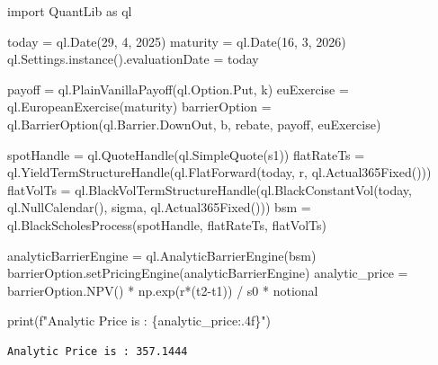 \documentclass[
  a4paper,
  DIV=11,
  numbers=noendperiod]{scrreprt}
\newenvironment{Shaded}{\begin{snugshade}}{\end{snugshade}}
\newcommand{\BuiltInTok}[1]{\textcolor[rgb]{0.00,0.23,0.31}{#1}}
\newcommand{\DecValTok}[1]{\textcolor[rgb]{0.68,0.00,0.00}{#1}}
\newcommand{\ImportTok}[1]{\textcolor[rgb]{0.00,0.46,0.62}{#1}}
\newcommand{\NormalTok}[1]{\textcolor[rgb]{0.00,0.23,0.31}{#1}}
\newcommand{\OperatorTok}[1]{\textcolor[rgb]{0.37,0.37,0.37}{#1}}
\newcommand{\SpecialCharTok}[1]{\textcolor[rgb]{0.37,0.37,0.37}{#1}}
\newcommand{\SpecialStringTok}[1]{\textcolor[rgb]{0.13,0.47,0.30}{#1}}
\begin{document}
\begin{tcolorbox}[enhanced jigsaw, bottomtitle=1mm, breakable, coltitle=black, opacityback=0, titlerule=0mm, left=2mm, colbacktitle=quarto-callout-tip-color!10!white, toptitle=1mm, colframe=quarto-callout-tip-color-frame, bottomrule=.15mm, opacitybacktitle=0.6, leftrule=.75mm, title=\textcolor{quarto-callout-tip-color}{\faLightbulb}\hspace{0.5em}{QuantLib을 이용한 배리어옵션 평가}, arc=.35mm, toprule=.15mm, rightrule=.15mm, colback=white]

\begin{Shaded}
\begin{Highlighting}[]
\ImportTok{import}\NormalTok{ QuantLib }\ImportTok{as}\NormalTok{ ql}

\NormalTok{today }\OperatorTok{=}\NormalTok{ ql.Date(}\DecValTok{29}\NormalTok{, }\DecValTok{4}\NormalTok{, }\DecValTok{2025}\NormalTok{)}
\NormalTok{maturity }\OperatorTok{=}\NormalTok{ ql.Date(}\DecValTok{16}\NormalTok{, }\DecValTok{3}\NormalTok{, }\DecValTok{2026}\NormalTok{)}
\NormalTok{ql.Settings.instance().evaluationDate }\OperatorTok{=}\NormalTok{ today}

\NormalTok{payoff }\OperatorTok{=}\NormalTok{ ql.PlainVanillaPayoff(ql.Option.Put, k)}
\NormalTok{euExercise }\OperatorTok{=}\NormalTok{ ql.EuropeanExercise(maturity)}
\NormalTok{barrierOption }\OperatorTok{=}\NormalTok{ ql.BarrierOption(ql.Barrier.DownOut, b, rebate, payoff, euExercise)}

\NormalTok{spotHandle }\OperatorTok{=}\NormalTok{ ql.QuoteHandle(ql.SimpleQuote(s1))}
\NormalTok{flatRateTs }\OperatorTok{=}\NormalTok{ ql.YieldTermStructureHandle(ql.FlatForward(today, r, ql.Actual365Fixed()))}
\NormalTok{flatVolTs }\OperatorTok{=}\NormalTok{ ql.BlackVolTermStructureHandle(ql.BlackConstantVol(today, ql.NullCalendar(), sigma, ql.Actual365Fixed()))}
\NormalTok{bsm }\OperatorTok{=}\NormalTok{ ql.BlackScholesProcess(spotHandle, flatRateTs, flatVolTs)}

\NormalTok{analyticBarrierEngine }\OperatorTok{=}\NormalTok{ ql.AnalyticBarrierEngine(bsm)}
\NormalTok{barrierOption.setPricingEngine(analyticBarrierEngine)}
\NormalTok{analytic\_price }\OperatorTok{=}\NormalTok{ barrierOption.NPV() }\OperatorTok{*}\NormalTok{ np.exp(r}\OperatorTok{*}\NormalTok{(t2}\OperatorTok{{-}}\NormalTok{t1)) }\OperatorTok{/}\NormalTok{ s0 }\OperatorTok{*}\NormalTok{ notional}

\BuiltInTok{print}\NormalTok{(}\SpecialStringTok{f"Analytic Price is : }\SpecialCharTok{\{}\NormalTok{analytic\_price}\SpecialCharTok{:.4f\}}\SpecialStringTok{"}\NormalTok{)}
\end{Highlighting}
\end{Shaded}

\begin{verbatim}
Analytic Price is : 357.1444
\end{verbatim}

\end{tcolorbox}
\end{document}
